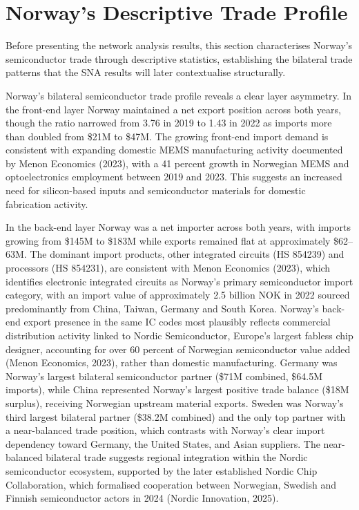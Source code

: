 
\section{Norway's Descriptive Trade Profile}
\label{sec:descriptive}

Before presenting the network analysis results, this section characterises
Norway's semiconductor trade through descriptive statistics, establishing
the bilateral trade patterns that the SNA results will later contextualise
structurally.

Norway's bilateral semiconductor trade profile reveals a clear layer asymmetry. In the front-end layer Norway maintained a net export position across both years, though the ratio narrowed from 3.76 in 2019 to 1.43 in 2022 as imports more than doubled from \$21M to \$47M. The growing front-end import demand is consistent with expanding domestic MEMS manufacturing activity documented by Menon Economics (2023), with a 41 percent growth in Norwegian MEMS and optoelectronics employment between 2019 and 2023. This suggests an increased need for silicon-based inputs and semiconductor materials for domestic fabrication activity.

In the back-end layer Norway was a net importer across both years, with imports growing from \$145M to \$183M while exports remained flat at approximately \$62--63M. The dominant import products, other integrated circuits (HS 854239) and processors (HS 854231), are consistent with Menon Economics (2023), which identifies electronic integrated circuits as Norway's primary semiconductor import category, with an import value of approximately 2.5 billion NOK in 2022 sourced predominantly from China, Taiwan, Germany and South Korea. Norway's back-end export presence in the same IC codes most plausibly reflects commercial distribution activity linked to Nordic Semiconductor, Europe's largest fabless chip designer, accounting for over 60 percent of Norwegian semiconductor value added (Menon Economics, 2023), rather than domestic manufacturing. Germany was Norway's largest bilateral semiconductor partner (\$71M combined, \$64.5M imports), while China represented Norway's largest positive trade balance (\$18M surplus), receiving Norwegian upstream material exports. Sweden was Norway's third largest bilateral partner (\$38.2M combined) and the only top partner with a near-balanced trade position, which contrasts with Norway's clear import dependency toward Germany, the United States, and Asian suppliers. The near-balanced bilateral trade suggests regional integration within the Nordic semiconductor ecosystem, supported by the later established Nordic Chip Collaboration, which formalised cooperation between Norwegian, Swedish and Finnish semiconductor actors in 2024 (Nordic Innovation, 2025).

